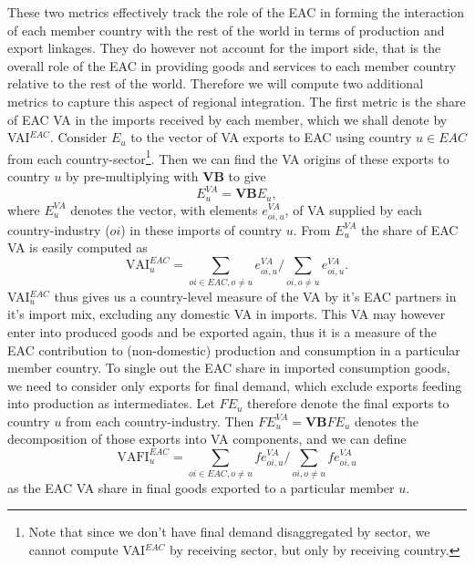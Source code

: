 \documentclass[a4paper]{article}
\begin{document}
These two metrics effectively track the role of the EAC in forming the interaction of each member country with the rest of the world in terms of production and export linkages. They do however not account for the import side, that is the overall role of the EAC in providing goods and services to each member country relative to the rest of the world. Therefore we will compute two additional metrics to capture this aspect of regional integration. The first metric is the share of EAC VA in the imports received by each member, which we shall denote by VAI$^{EAC}$. Consider $E_u$ to the vector of VA exports to EAC using country $u \in EAC$ from each country-sector\footnote{Note that since we don't have final demand disaggregated by sector, we cannot compute VAI$^{EAC}$ by receiving sector, but only by receiving country.}.%
Then we can find the VA origins of these exports to country $u$ by pre-multiplying with \textbf{VB} to give 
\begin{equation}
E_u^{VA} = \textbf{VB}E_u,
\end{equation}
 where $E_u^{VA}$ denotes the vector, with elements $e_{oi, u}^{VA}$, of VA supplied by each country-industry ($oi$) in these imports of country $u$. From  $E_u^{VA}$ the share of EAC VA is easily computed as 
\begin{equation}
\text{VAI}_u^{EAC} = \sum_{oi \in EAC, o \neq u}  e_{oi, u}^{VA}  \bigg/ \sum_{oi, o \neq u}  e_{oi, u}^{VA}.  
\end{equation}
VAI$_u^{EAC}$ thus gives us a country-level measure of the VA by it's EAC partners in it's import mix, excluding any domestic VA in imports. This VA may however enter into produced goods and be exported again, thus it is a measure of the EAC contribution to (non-domestic) production and consumption in a particular member country. To single out the EAC share in imported consumption goods, we need to consider only exports for final demand, which exclude exports feeding into production as intermediates. Let $FE_u$ therefore denote the final exports to country $u$ from each country-industry. Then $FE_u^{VA} = \textbf{VB}FE_u$ denotes the decomposition of those exports into VA components, and we can define 
\begin{equation}
\text{VAFI}_{u}^{EAC} = \sum_{oi \in EAC, o \neq u}  fe_{oi, u}^{VA}  \bigg/ \sum_{oi, o \neq u}  fe_{oi, u}^{VA}
\end{equation}
as the EAC VA share in final goods exported to a particular member $u$. 
\end{document}
